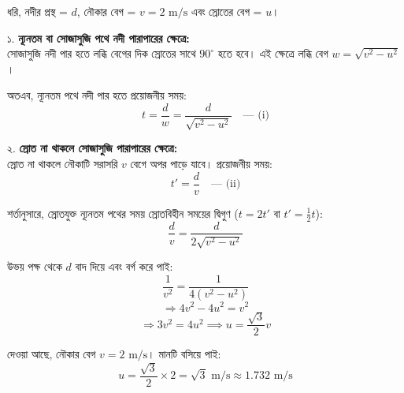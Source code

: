 \documentclass[11pt,a4paper]{article}
\begin{document}
\begin{solbox}
\begin{center}
\end{center}

ধরি, নদীর প্রস্থ = $d$, নৌকার বেগ = $v = 2\text{ m/s}$ এবং স্রোতের বেগ = $u$।

১. \textbf{ন্যূনতম বা সোজাসুজি পথে নদী পারাপারের ক্ষেত্রে:} \\
সোজাসুজি নদী পার হতে লব্ধি বেগের দিক স্রোতের সাথে $90^\circ$ হতে হবে। এই ক্ষেত্রে লব্ধি বেগ $w = \sqrt{v^2 - u^2}$।

অতএব, ন্যূনতম পথে নদী পার হতে প্রয়োজনীয় সময়:
$$t = \frac{d}{w} = \frac{d}{\sqrt{v^2 - u^2}} \quad \text{--- (i)}$$

২. \textbf{স্রোত না থাকলে সোজাসুজি পারাপারের ক্ষেত্রে:} \\
স্রোত না থাকলে নৌকাটি সরাসরি $v$ বেগে অপর পাড়ে যাবে। প্রয়োজনীয় সময়:
$$t' = \frac{d}{v} \quad \text{--- (ii)}$$

শর্তানুসারে, স্রোতযুক্ত ন্যূনতম পথের সময় স্রোতবিহীন সময়ের দ্বিগুণ ($t = 2t'$ বা $t' = \frac{1}{2}t$):
$$\frac{d}{v} = \frac{d}{2\sqrt{v^2 - u^2}}$$

উভয় পক্ষ থেকে $d$ বাদ দিয়ে এবং বর্গ করে পাই:
$$\frac{1}{v^2} = \frac{1}{4(v^2 - u^2)}$$
$$\Rightarrow 4v^2 - 4u^2 = v^2$$
$$\Rightarrow 3v^2 = 4u^2 \implies u = \frac{\sqrt{3}}{2}v$$

দেওয়া আছে, নৌকার বেগ $v = 2\text{ m/s}$। মানটি বসিয়ে পাই:
$$u = \frac{\sqrt{3}}{2} \times 2 = \sqrt{3}\text{ m/s} \approx 1.732\text{ m/s}$$


\end{solbox}
\end{document}
